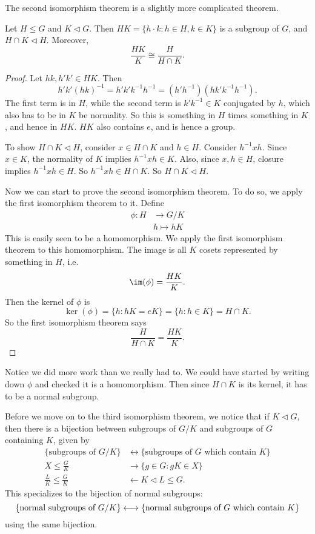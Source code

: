 \documentclass[a4paper]{article}
\begin{document}
The second isomorphism theorem is a slightly more complicated theorem.
\begin{thm}
  Let $H \leq G$ and $K \lhd G$. Then $HK = \{h\cdot k: h \in H, k \in K\}$ is a subgroup of $G$, and $H\cap K \lhd H$. Moreover,
  \[
    \frac{HK}{K} \cong \frac{H}{H \cap K}.
  \]
\end{thm}

\begin{proof}
  Let $hk, h'k' \in HK$. Then
  \[
    h'k'(hk)^{-1} = h'k' k^{-1}h^{-1} = (h'h^{-1})(hk'k^{-1}h^{-1}).
  \]
  The first term is in $H$, while the second term is $k'k^{-1} \in K$ conjugated by $h$, which also has to be in $K$ be normality. So this is something in $H$ times something in $K$, and hence in $HK$. $HK$ also contains $e$, and is hence a group.

  To show $H \cap K \lhd H$, consider $x \in H\cap K$ and $h \in H$. Consider $h^{-1} x h$. Since $x \in K$, the normality of $K$ implies $h^{-1}xh \in K$. Also, since $x, h \in H$, closure implies $h^{-1}xh \in H$. So $h^{-1} x h \in H \cap K$. So $H \cap K \lhd H$.

  Now we can start to prove the second isomorphism theorem. To do so, we apply the first isomorphism theorem to it. Define
  \begin{align*}
    \phi: H &\to G/K\\
    &h \mapsto hK
  \end{align*}
  This is easily seen to be a homomorphism. We apply the first isomorphism theorem to this homomorphism. The image is all $K$ cosets represented by something in $H$, i.e.
  \[
    \im (\phi) = \frac{HK}{K}.
  \]
  Then the kernel of $\phi$ is
  \[
    \ker(\phi) = \{h: hK = eK\} = \{h: h \in K\} = H \cap K.
  \]
  So the first isomorphism theorem says
  \[
    \frac{H}{H \cap K} = \frac{HK}{K}.
  \]
\end{proof}
Notice we did more work than we really had to. We could have started by writing down $\phi$ and checked it is a homomorphism. Then since $H \cap K$ is its kernel, it has to be a normal subgroup.

Before we move on to the third isomorphism theorem, we notice that if $K \lhd G$, then there is a bijection between subgroups of $G/K$ and subgroups of $G$ containing $K$, given by
\begin{align*}
  \{\text{subgroups of }G/K\} &\longleftrightarrow\{\text{subgroups of }G\text{ which contain }K\}\\
  X \leq \frac{G}{K} &\longrightarrow \{g \in G: gK \in X\}\\
  \frac{L}{K} \leq \frac{G}{K} &\longleftarrow K \lhd L \leq G.
\end{align*}
This specializes to the bijection of normal subgroups:
\[
  \{\text{normal subgroups of }G/K\} \longleftrightarrow\{\text{normal subgroups of }G\text{ which contain }K\}\\
\]
using the same bijection.
\end{document}
